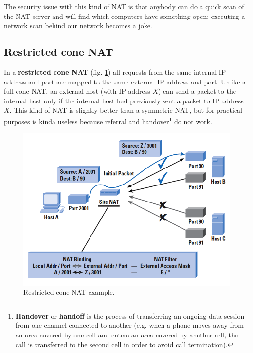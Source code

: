 The security issue with this kind of NAT is that anybody can do a quick scan of the NAT server and will find which computers have something open: executing a network scan behind our network becomes a joke.

\subsection{Restricted cone NAT}
In a \textbf{restricted cone NAT} (fig. \ref{fig:restr_cone_nat}) all requests from the same internal IP address and port are mapped to the same external IP address and port. Unlike a full cone NAT, an external host (with IP address $X$) can send a packet to the internal host only if the internal host had previously sent a packet to IP address $X$. This kind of NAT is slightly better than a symmetric NAT, but for practical purposes is kinda useless because referral and handover\footnote{\textbf{Handover} or \textbf{handoff} is the process of transferring an ongoing data session from one channel connected to another (e.g. when a phone moves away from an area covered by one cell and enters an area covered by another cell, the call is transferred to the second cell in order to avoid call termination).} do not work.

\begin{figure}[h]
    \centering
    \includegraphics[scale=0.6]{img/restr_cone_nat.png}
    \decoRule
    \caption{Restricted cone NAT example.}
    \label{fig:restr_cone_nat}
\end{figure}

